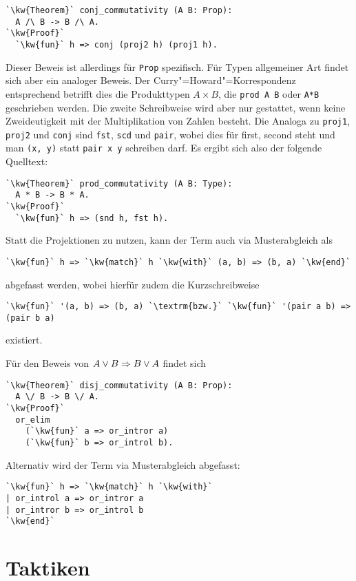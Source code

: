 \noindent
\begin{lstlisting}[escapechar=`, xleftmargin=\mathindent]
`\kw{Theorem}` conj_commutativity (A B: Prop):
  A /\ B -> B /\ A.
`\kw{Proof}`
  `\kw{fun}` h => conj (proj2 h) (proj1 h).
\end{lstlisting}
Dieser Beweis ist allerdings für \texttt{Prop} spezifisch. Für Typen
allgemeiner Art findet sich aber ein analoger Beweis. Der
Curry"=Howard"=Korrespondenz entsprechend betrifft dies die Produkttypen
$A\times B$, die \verb|prod A B| oder \verb|A*B| geschrieben werden. Die
zweite Schreibweise wird aber nur gestattet, wenn keine Zweideutigkeit
mit der Multiplikation von Zahlen besteht. Die Analoga zu
\texttt{proj1}, \texttt{proj2} und \texttt{conj} sind
\texttt{fst}, \texttt{scd} und \texttt{pair}, wobei dies für
first, second steht und man \verb|(x, y)| statt \verb|pair x y|
schreiben darf. Es ergibt sich also der folgende Quelltext:
\begin{lstlisting}[escapechar=`, xleftmargin=\mathindent]
`\kw{Theorem}` prod_commutativity (A B: Type):
  A * B -> B * A.
`\kw{Proof}`
  `\kw{fun}` h => (snd h, fst h).
\end{lstlisting}
Statt die Projektionen zu nutzen, kann der Term auch via
Musterabgleich als
\begin{lstlisting}[escapechar=`, xleftmargin=\mathindent]
`\kw{fun}` h => `\kw{match}` h `\kw{with}` (a, b) => (b, a) `\kw{end}`
\end{lstlisting}
abgefasst werden, wobei hierfür zudem die Kurzschreibweise
\begin{lstlisting}[escapechar=`, xleftmargin=\mathindent]
`\kw{fun}` '(a, b) => (b, a) `\textrm{bzw.}` `\kw{fun}` '(pair a b) => (pair b a)
\end{lstlisting}
existiert.

Für den Beweis von $A\lor B\Rightarrow B\lor A$ findet sich
\begin{lstlisting}[escapechar=`, xleftmargin=\mathindent]
`\kw{Theorem}` disj_commutativity (A B: Prop):
  A \/ B -> B \/ A.
`\kw{Proof}`
  or_elim
    (`\kw{fun}` a => or_intror a)
    (`\kw{fun}` b => or_introl b).
\end{lstlisting}
Alternativ wird der Term via Musterabgleich abgefasst:
\begin{lstlisting}[escapechar=`, xleftmargin=\mathindent]
`\kw{fun}` h => `\kw{match}` h `\kw{with}`
| or_introl a => or_intror a
| or_intror b => or_introl b
`\kw{end}`
\end{lstlisting}

\section{Taktiken}

